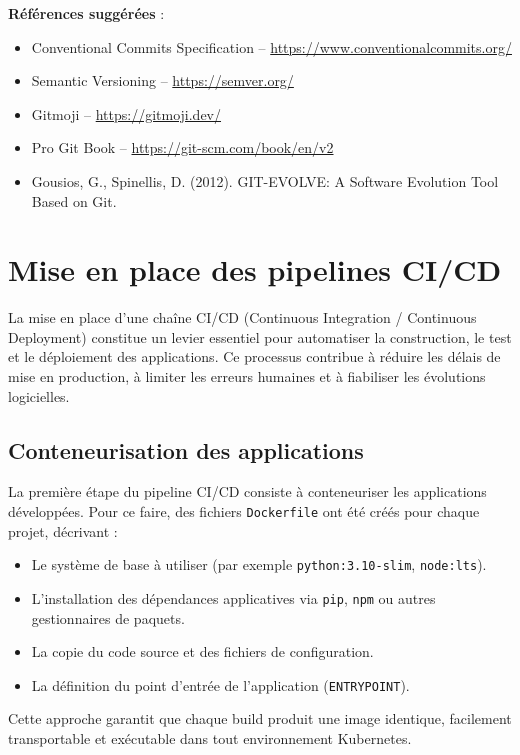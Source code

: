 \textbf{Références suggérées} :
\begin{itemize}
	\item Conventional Commits Specification – \url{https://www.conventionalcommits.org/}
	\item Semantic Versioning – \url{https://semver.org/}
	\item Gitmoji – \url{https://gitmoji.dev/}
	\item Pro Git Book – \url{https://git-scm.com/book/en/v2}
	\item Gousios, G., Spinellis, D. (2012). GIT-EVOLVE: A Software Evolution Tool Based on Git.
\end{itemize}

\section{Mise en place des pipelines CI/CD}

La mise en place d’une chaîne CI/CD (Continuous Integration / Continuous Deployment) constitue un levier essentiel pour automatiser la construction, le test et le déploiement des applications.
Ce processus contribue à réduire les délais de mise en production, à limiter les erreurs humaines et à fiabiliser les évolutions logicielles.

\subsection{Conteneurisation des applications}

La première étape du pipeline CI/CD consiste à conteneuriser les applications développées.
Pour ce faire, des fichiers \texttt{Dockerfile} ont été créés pour chaque projet, décrivant :
\begin{itemize}
	\item Le système de base à utiliser (par exemple \texttt{python:3.10-slim}, \texttt{node:lts}).
	\item L’installation des dépendances applicatives via \texttt{pip}, \texttt{npm} ou autres gestionnaires de paquets.
	\item La copie du code source et des fichiers de configuration.
	\item La définition du point d’entrée de l’application (\texttt{ENTRYPOINT}).
\end{itemize}

Cette approche garantit que chaque build produit une image identique, facilement transportable et exécutable dans tout environnement Kubernetes.

